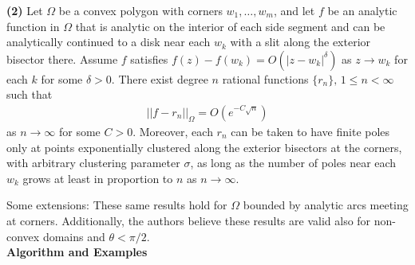 \documentclass[12]{article}
\begin{document}
	\textbf{(2)} Let $\Omega$ be a convex polygon with corners $w_1 , \ldots , w_m$, and let $f$ be an analytic function in $\Omega$ that is analytic on the interior of each side segment and can be analytically continued to a disk near each $w_k$ with a slit along the exterior bisector there. Assume $f$ satisfies $f(z)-f(w_k)=O(|z-w_k|^\delta)$ as $z \to w_k$ for each $k$ for some $\delta >0$. There exist degree $n$ rational functions $\{r_n\},\, 1 \leq n < \infty$ such that
	\begin{align*}
	||f-r_n||_\Omega=O(e^{-C\sqrt{n}})
	\end{align*}
as $n\to \infty$ for some $C>0$. Moreover, each $r_n$ can be taken to have finite poles only at points exponentially clustered along the exterior bisectors at the corners, with arbitrary clustering parameter $\sigma$, as long as the number of poles near each $w_k$ grows at least in proportion to $n$ as $n\to \infty$.
	
	Some extensions: These same results hold for $\Omega$ bounded by analytic arcs meeting at corners. Additionally, the authors believe these results are valid also for non-convex domains and $\theta < \pi /2$.\\
	
\noindent
\textbf{Algorithm and Examples}
\end{document}
